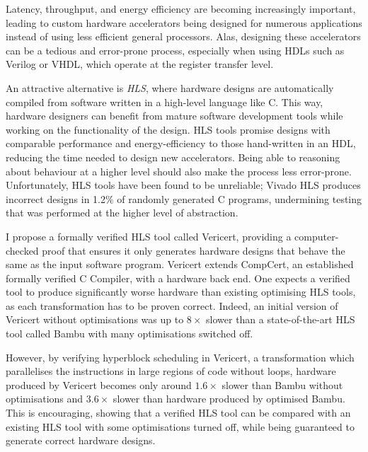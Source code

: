 
Latency, throughput, and energy efficiency are becoming increasingly important,
leading to custom hardware accelerators being designed for numerous applications
instead of using less efficient general processors.  Alas, designing these
accelerators can be a tedious and error-prone process, especially when using
\glspl{HDL} such as Verilog or VHDL, which operate at the register transfer
level.

An attractive alternative is \emph{\gls{HLS}}, where hardware designs are
automatically compiled from software written in a high-level language like C.
This way, hardware designers can benefit from mature software development tools
while working on the functionality of the design.  \gls{HLS} tools promise
designs with comparable performance and energy-efficiency to those hand-written
in an \gls{HDL}, reducing the time needed to design new accelerators.  Being
able to reasoning about behaviour at a higher level should also make the process
less error-prone.  Unfortunately, \gls{HLS} tools have been found to be
unreliable; Vivado HLS produces incorrect designs in 1.2\% of randomly generated
C programs, undermining testing that was performed at the higher level of
abstraction.

I propose a formally verified \gls{HLS} tool called Vericert, providing a
computer-checked proof that ensures it only generates hardware designs that
behave the same as the input software program.  Vericert extends CompCert, an
established formally verified C Compiler, with a hardware back end.  One expects
a verified tool to produce significantly worse hardware than existing optimising
\gls{HLS} tools, as each transformation has to be proven correct.  Indeed, an
initial version of Vericert without optimisations was up to $8\times$ slower
than a state-of-the-art \gls{HLS} tool called Bambu with many optimisations
switched off.

However, by verifying hyperblock scheduling in Vericert, a transformation which
parallelises the instructions in large regions of code without loops, hardware
produced by Vericert becomes only around $1.6\times$ slower than Bambu without
optimisations and $3.6\times$ slower than hardware produced by optimised Bambu.
This is encouraging, showing that a verified \gls{HLS} tool can be compared with
an existing \gls{HLS} tool with some optimisations turned off, while being
guaranteed to generate correct hardware designs.

